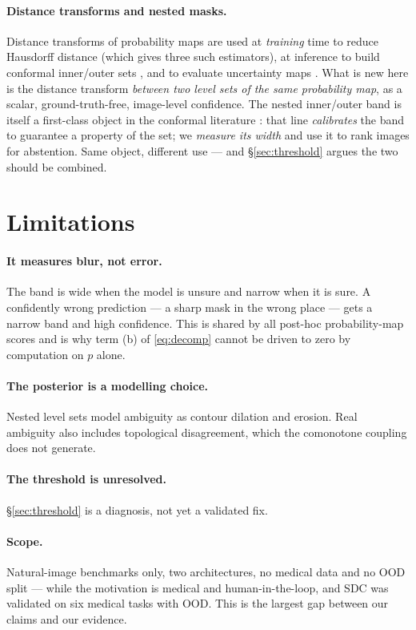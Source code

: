 \documentclass[11pt]{article}
\theoremstyle{remark}
\begin{document}
\paragraph{Distance transforms and nested masks.} Distance transforms of probability
maps are used at \emph{training} time to reduce Hausdorff distance \cite{karimi}
(which gives three such estimators), at inference to build conformal inner/outer sets
\cite{davenport,mossina}, and to evaluate uncertainty maps \cite{buc}. What is new
here is the distance transform \emph{between two level sets of the same probability
map}, as a scalar, ground-truth-free, image-level confidence. The nested inner/outer
band is itself a first-class object in the conformal literature
\cite{crc,davenport,mossina}: that line \emph{calibrates} the band to guarantee a
property of the set; we \emph{measure its width} and use it to rank images for
abstention. Same object, different use --- and \S\ref{sec:threshold} argues the two
should be combined.

\section{Limitations}\label{sec:limitations}

\paragraph{It measures blur, not error.} The band is wide when the model is unsure
and narrow when it is sure. A confidently wrong prediction --- a sharp mask in the
wrong place --- gets a narrow band and high confidence. This is shared by all
post-hoc probability-map scores and is why term (b) of \eqref{eq:decomp} cannot be
driven to zero by computation on $p$ alone.

\paragraph{The posterior is a modelling choice.} Nested level sets model ambiguity as
contour dilation and erosion. Real ambiguity also includes topological disagreement,
which the comonotone coupling does not generate.

\paragraph{The threshold is unresolved.} \S\ref{sec:threshold} is a diagnosis, not
yet a validated fix.

\paragraph{Scope.} Natural-image benchmarks only, two architectures, no medical data
and no OOD split --- while the motivation is medical and human-in-the-loop, and SDC
was validated on six medical tasks with OOD. This is the largest gap between our
claims and our evidence.
\end{document}
